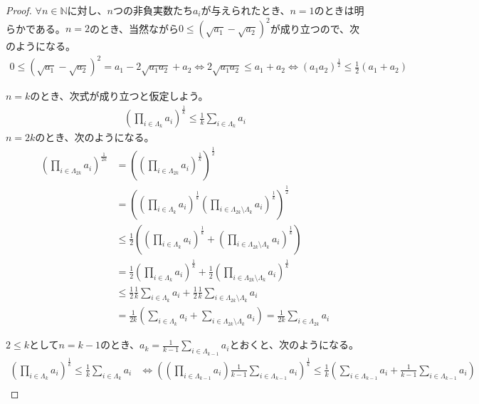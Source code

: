 \documentclass[dvipdfmx]{jsarticle}
\begin{document}
\begin{proof}
$\forall n \in \mathbb{N}$に対し、$n$つの非負実数たち$a_{i}$が与えられたとき、$n = 1$のときは明らかである。$n = 2$のとき、当然ながら$0 \leq \left( \sqrt{a_{1}} - \sqrt{a_{2}} \right)^{2}$が成り立つので、次のようになる。
\begin{align*}
0 \leq \left( \sqrt{a_{1}} - \sqrt{a_{2}} \right)^{2} = a_{1} - 2\sqrt{a_{1}a_{2}} + a_{2} \Leftrightarrow 2\sqrt{a_{1}a_{2}} \leq a_{1} + a_{2} \Leftrightarrow \left( a_{1}a_{2} \right)^{\frac{1}{2}} \leq \frac{1}{2}\left( a_{1} + a_{2} \right)
\end{align*}\par
$n = k$のとき、次式が成り立つと仮定しよう。
\begin{align*}
\left( \prod_{i \in \varLambda_{k}} a_{i} \right)^{\frac{1}{k}} \leq \frac{1}{k}\sum_{i \in \varLambda_{k}} a_{i}
\end{align*}
$n = 2k$のとき、次のようになる。
\begin{align*}
\left( \prod_{i \in \varLambda_{2k}} a_{i} \right)^{\frac{1}{2k}} &= \left( \left( \prod_{i \in \varLambda_{2k}} a_{i} \right)^{\frac{1}{k}} \right)^{\frac{1}{2}}\\
&= \left( \left( \prod_{i \in \varLambda_{k}} a_{i} \right)^{\frac{1}{k}}\left( \prod_{i \in \varLambda_{2k} \setminus \varLambda_{k}} a_{i} \right)^{\frac{1}{k}} \right)^{\frac{1}{2}}\\
&\leq \frac{1}{2}\left( \left( \prod_{i \in \varLambda_{k}} a_{i} \right)^{\frac{1}{k}} + \left( \prod_{i \in \varLambda_{2k} \setminus \varLambda_{k}} a_{i} \right)^{\frac{1}{k}} \right)\\
&= \frac{1}{2}\left( \prod_{i \in \varLambda_{k}} a_{i} \right)^{\frac{1}{k}} + \frac{1}{2}\left( \prod_{i \in \varLambda_{2k} \setminus \varLambda_{k}} a_{i} \right)^{\frac{1}{k}}\\
&\leq \frac{1}{2}\frac{1}{k}\sum_{i \in \varLambda_{k}} a_{i} + \frac{1}{2}\frac{1}{k}\sum_{i \in \varLambda_{2k} \setminus \varLambda_{k}} a_{i}\\
&= \frac{1}{2k}\left( \sum_{i \in \varLambda_{k}} a_{i} + \sum_{i \in \varLambda_{2k} \setminus \varLambda_{k}} a_{i} \right) = \frac{1}{2k}\sum_{i \in \varLambda_{2k}} a_{i}
\end{align*}\par
$2 \leq k$として$n = k - 1$のとき、$a_{k} = \frac{1}{k - 1}\sum_{i \in \varLambda_{k - 1}} a_{i}$とおくと、次のようになる。
\begin{align*}
\left( \prod_{i \in \varLambda_{k}} a_{i} \right)^{\frac{1}{k}} \leq \frac{1}{k}\sum_{i \in \varLambda_{k}} a_{i} &\Leftrightarrow \left( \left( \prod_{i \in \varLambda_{k - 1}} a_{i} \right)\frac{1}{k - 1}\sum_{i \in \varLambda_{k - 1}} a_{i} \right)^{\frac{1}{k}} \leq \frac{1}{k}\left( \sum_{i \in \varLambda_{k - 1}} a_{i} + \frac{1}{k - 1}\sum_{i \in \varLambda_{k - 1}} a_{i} \right)\\

\end{align*}
\end{proof}
\end{document}
